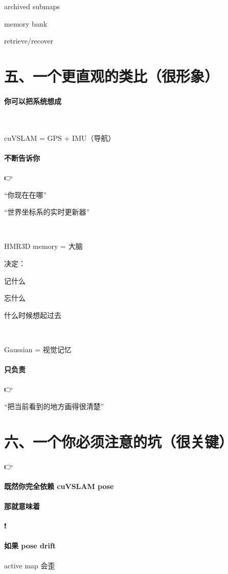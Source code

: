 \documentclass[12pt]{article}
\begin{document}
archived submaps

memory bank

retrieve/recover

\section{五、一个更直观的类比（很形象）}
\paragraph{你可以把系统想成}
🧭

cuVSLAM = GPS + IMU（导航）

\paragraph{不断告诉你}
👉

“你现在在哪”

“世界坐标系的实时更新器”

🧠

HMR3D memory = 大脑

决定：

记什么

忘什么

什么时候想起过去

🎨

Gaussian = 视觉记忆

\paragraph{只负责}
👉

“把当前看到的地方画得很清楚”

\section{六、一个你必须注意的坑（很关键）}
👉

\paragraph{既然你完全依赖 cuVSLAM pose}
\paragraph{那就意味着}
❗

\paragraph{如果 pose drift}
active map 会歪
\end{document}
